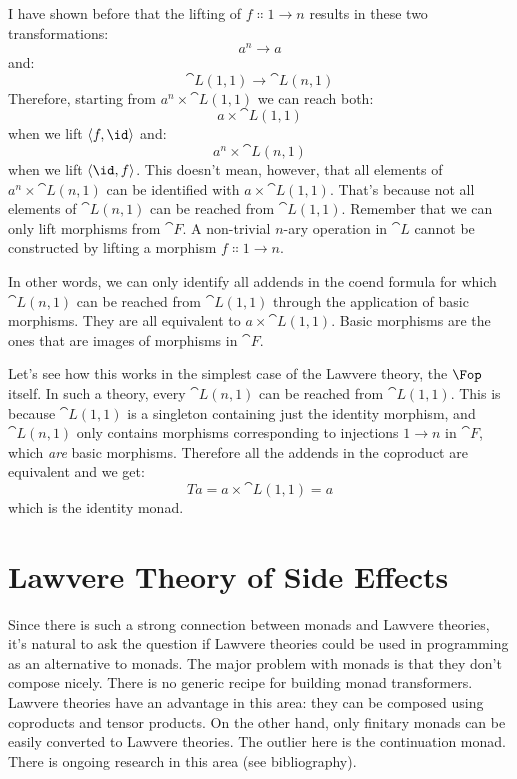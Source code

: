 \begin{figure}[H]
  \centering
\end{figure}

\noindent
I have shown before that the lifting of
$f \Colon 1 \to n$ results in these two
transformations:
\[a^n \to a\]
and:
\[\cat{L}(1, 1) \to \cat{L}(n, 1)\]
Therefore, starting from $a^n \times \cat{L}(1, 1)$ we can reach both:
\[a \times \cat{L}(1, 1)\]
when we lift $\langle f, \id \rangle$ and:
\[a^n \times \cat{L}(n, 1)\]
when we lift $\langle \id, f \rangle$. This doesn't
mean, however, that all elements of $a^n \times \cat{L}(n, 1)$ can be
identified with $a \times \cat{L}(1, 1)$. That's because not all elements
of $\cat{L}(n, 1)$ can be reached from $\cat{L}(1, 1)$. Remember
that we can only lift morphisms from $\cat{F}$. A non-trivial $n$-ary
operation in $\cat{L}$ cannot be constructed by lifting a morphism
$f \Colon 1 \to n$.

In other words, we can only identify all addends in the coend formula
for which $\cat{L}(n, 1)$ can be reached from $\cat{L}(1, 1)$
through the application of basic morphisms. They are all equivalent to
$a \times \cat{L}(1, 1)$. Basic morphisms are the ones that are images of
morphisms in $\cat{F}$.

Let's see how this works in the simplest case of the Lawvere theory, the
$\Fop$ itself. In such a theory, every
$\cat{L}(n, 1)$ can be reached from $\cat{L}(1, 1)$. This is because
$\cat{L}(1, 1)$ is a singleton containing just the identity morphism,
and $\cat{L}(n, 1)$ only contains morphisms corresponding to
injections $1 \to n$ in $\cat{F}$, which \emph{are}
basic morphisms. Therefore all the addends in the coproduct are
equivalent and we get:
\[T a = a \times \cat{L}(1, 1) = a\]
which is the identity monad.

\section{Lawvere Theory of Side Effects}

Since there is such a strong connection between monads and Lawvere
theories, it's natural to ask the question if Lawvere theories could be
used in programming as an alternative to monads. The major problem with
monads is that they don't compose nicely. There is no generic recipe for
building monad transformers. Lawvere theories have an advantage in this
area: they can be composed using coproducts and tensor products. On the
other hand, only finitary monads can be easily converted to Lawvere
theories. The outlier here is the continuation monad. There is ongoing
research in this area (see bibliography).

